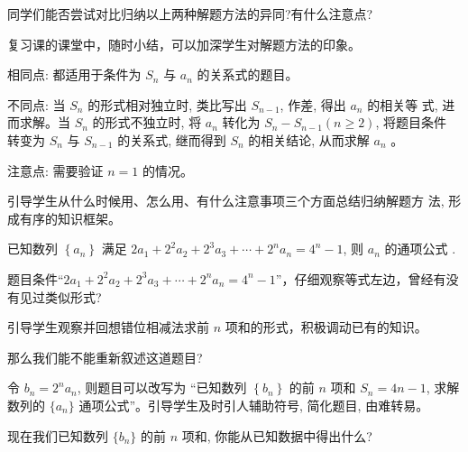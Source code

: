 \begin{question}
  同学们能否尝试对比归纳以上两种解题方法的异同?有什么注意点?
\end{question}

\begin{designgoal}
  复习课的课堂中，随时小结，可以加深学生对解题方法的印象。
\end{designgoal}

相同点: 都适用于条件为 $S_{n}$ 与 $a_{n}$ 的关系式的题目。

不同点: 当 $S_{n}$ 的形式相对独立时, 类比写出 $S_{n-1}$, 作差, 得出 $a_{n}$ 的相关等 式, 进而求解。当 $S_{n}$ 的形式不独立时, 将 $a_{n}$ 转化为 $S_{n}-S_{n-1}(n \geq 2)$, 将题目条件 转变为 $S_n$ 与 $S_{n-1}$ 的关系式, 继而得到 $S_n$ 的相关结论, 从而求解 $a_n$ 。

注意点: 需要验证 $n=1$ 的情况。

引导学生从什么时候用、怎么用、有什么注意事项三个方面总结归纳解题方 法, 形成有序的知识框架。


\begin{example}[2020·尤溪县第五中学高一期末]\label{example:尤溪县第五中学高一期末}
  已知数列 $\left\{a_{n}\right\}$ 满足 $2 a_{1}+2^{2} a_{2}+2^{3} a_{3}+\cdots+2^{n} a_{n}=4^{n}-1$, 则 $a_{n}$ 的通项公式 \underline{\hspace*{3em}}.
\end{example}

\begin{question}
  题目条件“$2 a_{1}+2^{2} a_{2}+2^{3} a_{3}+\cdots+2^{n} a_{n}=4^{n}-1$”，仔细观察等式左边，曾经有没有见过类似形式?
\end{question}

\begin{designgoal}
  引导学生观察并回想错位相减法求前 $n$ 项和的形式，积极调动已有的知识。
\end{designgoal}

\begin{question}
  那么我们能不能重新叙述这道题目?
\end{question}

\begin{designgoal}
  令 $b_n=2^{n} a_n$, 则题目可以改写为 “已知数列 $\left\{b_{n}\right\}$ 的前 $n$ 项和 $S_{n}=4 n-1$, 求解数列的 $\{a_{n}\}$ 通项公式”。引导学生及时引人辅助符号, 简化题目, 由难转易。
\end{designgoal}

\begin{question}
  现在我们已知数列 $\{b_{n}\}$ 的前 $n$ 项和, 你能从已知数据中得出什么?
\end{question}

